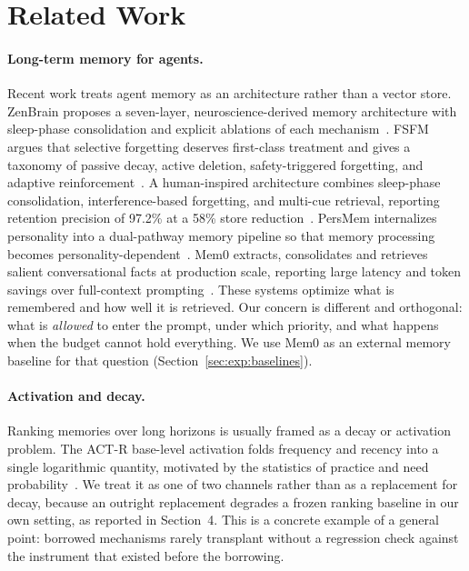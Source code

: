 \section{Related Work}\label{sec:related}

\paragraph{Long-term memory for agents.} Recent work treats agent memory as an
architecture rather than a vector store. ZenBrain proposes a seven-layer,
neuroscience-derived memory architecture with sleep-phase consolidation and
explicit ablations of each mechanism~\cite{zenbrain2026}. FSFM argues that
selective forgetting deserves first-class treatment and gives a taxonomy of
passive decay, active deletion, safety-triggered forgetting, and adaptive
reinforcement~\cite{fsfm2026}. A human-inspired architecture combines
sleep-phase consolidation, interference-based forgetting, and multi-cue
retrieval, reporting retention precision of 97.2\% at a 58\% store
reduction~\cite{himemory2026}. PersMem internalizes personality into a
dual-pathway memory pipeline so that memory processing becomes
personality-dependent~\cite{persmem2026}. Mem0 extracts, consolidates and
retrieves salient conversational facts at production scale, reporting large
latency and token savings over full-context prompting~\cite{mem0_2025}. These
systems optimize what is remembered and how well it is retrieved. Our concern is
different and orthogonal: what is \emph{allowed} to enter the prompt, under which
priority, and what happens when the budget cannot hold everything. We use Mem0 as
an external memory baseline for that question
(Section~\ref{sec:exp:baselines}).

\paragraph{Activation and decay.} Ranking memories over long horizons is usually
framed as a decay or activation problem. The ACT-R base-level activation folds
frequency and recency into a single logarithmic quantity, motivated by the
statistics of practice and need probability~\cite{anderson1991,anderson2007}.
We treat it as one of two channels rather than as a replacement for decay,
because an outright replacement degrades a frozen ranking baseline in our own
setting, as reported in Section~4. This is a concrete example of a general
point: borrowed mechanisms rarely transplant without a regression check against
the instrument that existed before the borrowing.

